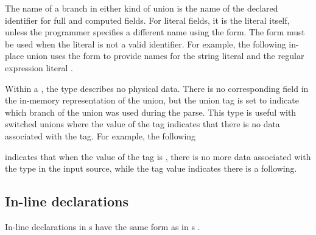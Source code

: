 The name of a branch in either kind of union is the name of the
declared identifier for full and computed fields.  For literal fields,
it is the literal itself, unless the programmer specifies a different
name using the \Pfrom{} form.  The \Pfrom{} form must be used when the
literal is not a valid \C{} identifier.  For example, the following
in-place union uses the \Pfrom{} form to provide names for the
string literal  and the regular expression literal .  


Within a \punion{}, the type \pvoid{} describes no physical data.
There is no corresponding field in the in-memory representation of the
union, but the union tag is set to indicate which branch of the union
was used during the parse.
This type is useful with switched unions where the value of the tag
indicates that there is no data associated with the tag.  For example,
the following \punion{}  


indicates that when the value of
the tag  is , there is no more data associated with
the type  in the input source, while the tag value 
indicates there is a  following.  





\subsection{In-line declarations}
\label{sec:unions-inline}
In-line declarations in \Punion{}s have the same form as in
\Pstruct{}s \cf{} .

